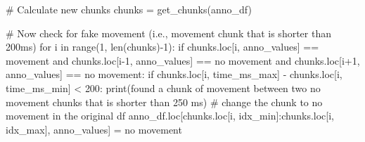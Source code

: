 \documentclass[
  letterpaper,
  DIV=11,
  numbers=noendperiod]{scrreprt}
\newenvironment{Shaded}{\begin{snugshade}}{\end{snugshade}}
\newcommand{\BuiltInTok}[1]{\textcolor[rgb]{0.00,0.23,0.31}{#1}}
\newcommand{\CommentTok}[1]{\textcolor[rgb]{0.37,0.37,0.37}{#1}}
\newcommand{\ControlFlowTok}[1]{\textcolor[rgb]{0.00,0.23,0.31}{#1}}
\newcommand{\DecValTok}[1]{\textcolor[rgb]{0.68,0.00,0.00}{#1}}
\newcommand{\KeywordTok}[1]{\textcolor[rgb]{0.00,0.23,0.31}{#1}}
\newcommand{\NormalTok}[1]{\textcolor[rgb]{0.00,0.23,0.31}{#1}}
\newcommand{\OperatorTok}[1]{\textcolor[rgb]{0.37,0.37,0.37}{#1}}
\newcommand{\StringTok}[1]{\textcolor[rgb]{0.13,0.47,0.30}{#1}}
\begin{document}
\begin{Shaded}
\begin{Highlighting}[]
        \CommentTok{\# Calculate new chunks}
\NormalTok{        chunks }\OperatorTok{=}\NormalTok{ get\_chunks(anno\_df)}

        \CommentTok{\# Now check for fake movement (i.e., movement chunk that is shorter than 200ms)}
        \ControlFlowTok{for}\NormalTok{ i }\KeywordTok{in} \BuiltInTok{range}\NormalTok{(}\DecValTok{1}\NormalTok{, }\BuiltInTok{len}\NormalTok{(chunks)}\OperatorTok{{-}}\DecValTok{1}\NormalTok{):}
            \ControlFlowTok{if}\NormalTok{ chunks.loc[i, }\StringTok{\textquotesingle{}anno\_values\textquotesingle{}}\NormalTok{] }\OperatorTok{==} \StringTok{\textquotesingle{}movement\textquotesingle{}} \KeywordTok{and}\NormalTok{ chunks.loc[i}\OperatorTok{{-}}\DecValTok{1}\NormalTok{, }\StringTok{\textquotesingle{}anno\_values\textquotesingle{}}\NormalTok{] }\OperatorTok{==} \StringTok{\textquotesingle{}no movement\textquotesingle{}} \KeywordTok{and}\NormalTok{ chunks.loc[i}\OperatorTok{+}\DecValTok{1}\NormalTok{, }\StringTok{\textquotesingle{}anno\_values\textquotesingle{}}\NormalTok{] }\OperatorTok{==} \StringTok{\textquotesingle{}no movement\textquotesingle{}}\NormalTok{:}
                \ControlFlowTok{if}\NormalTok{ chunks.loc[i, }\StringTok{\textquotesingle{}time\_ms\_max\textquotesingle{}}\NormalTok{] }\OperatorTok{{-}}\NormalTok{ chunks.loc[i, }\StringTok{\textquotesingle{}time\_ms\_min\textquotesingle{}}\NormalTok{] }\OperatorTok{\textless{}} \DecValTok{200}\NormalTok{:}
                    \BuiltInTok{print}\NormalTok{(}\StringTok{\textquotesingle{}found a chunk of movement between two no movement chunks that is shorter than 250 ms\textquotesingle{}}\NormalTok{)}
                    \CommentTok{\# change the chunk to no movement in the original df}
\NormalTok{                    anno\_df.loc[chunks.loc[i, }\StringTok{\textquotesingle{}idx\_min\textquotesingle{}}\NormalTok{]:chunks.loc[i, }\StringTok{\textquotesingle{}idx\_max\textquotesingle{}}\NormalTok{], }\StringTok{\textquotesingle{}anno\_values\textquotesingle{}}\NormalTok{] }\OperatorTok{=} \StringTok{\textquotesingle{}no movement\textquotesingle{}}


\end{Highlighting}
\end{Shaded}
\end{document}
